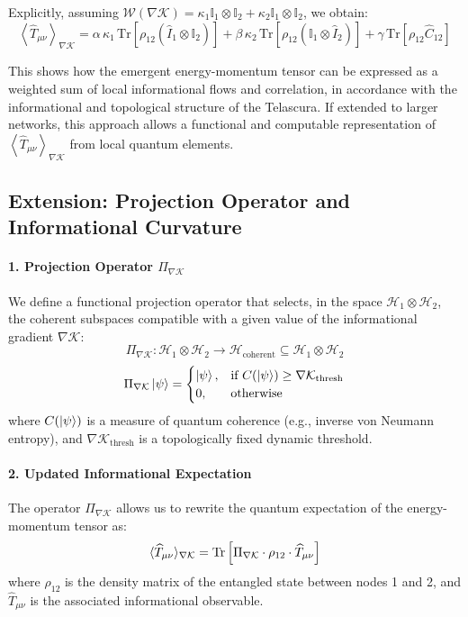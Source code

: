 \documentclass[12pt]{article}
\begin{document}
Explicitly, assuming $\mathcal{W}(\nabla \mathcal{K}) = \kappa_1 \mathbb{I}_1 \otimes \mathbb{I}_2 + \kappa_2 \mathbb{I}_1 \otimes \mathbb{I}_2$, we obtain:
\[
\left\langle \hat{T}_{\mu\nu} \right\rangle_{\nabla \mathcal{K}} = \alpha\, \kappa_1\, \text{Tr} \left[ \rho_{12} (\hat{I}_1 \otimes \mathbb{I}_2) \right] + \beta\, \kappa_2\, \text{Tr} \left[ \rho_{12} (\mathbb{I}_1 \otimes \hat{I}_2) \right] + \gamma\, \text{Tr} \left[ \rho_{12} \hat{C}_{12} \right]
\]

This shows how the emergent energy-momentum tensor can be expressed as a weighted sum of local informational flows and correlation, in accordance with the informational and topological structure of the Telascura. If extended to larger networks, this approach allows a functional and computable representation of $\left\langle \hat{T}_{\mu\nu} \right\rangle_{\nabla \mathcal{K}}$ from local quantum elements.

\subsection*{Extension: Projection Operator and Informational Curvature}

\paragraph{1. Projection Operator $\Pi_{\nabla \mathcal{K}}$}
We define a functional projection operator that selects, in the space $\mathcal{H}_1 \otimes \mathcal{H}_2$, the coherent subspaces compatible with a given value of the informational gradient $\nabla \mathcal{K}$:
\[
\Pi_{\nabla \mathcal{K}} : \mathcal{H}_1 \otimes \mathcal{H}_2 \rightarrow \mathcal{H}_{\text{coherent}} \subseteq \mathcal{H}_1 \otimes \mathcal{H}_2
\]
\[
\Pi_{\nabla \mathcal{K}} \ket{\psi} =
\begin{cases}
\ket{\psi}, & \text{if } C(\ket{\psi}) \geq \nabla \mathcal{K}_\text{thresh} \\
0, & \text{otherwise}
\end{cases}
\]
where $C(\ket{\psi})$ is a measure of quantum coherence (e.g., inverse von Neumann entropy), and $\nabla \mathcal{K}_\text{thresh}$ is a topologically fixed dynamic threshold.

\paragraph{2. Updated Informational Expectation}
The operator $\Pi_{\nabla \mathcal{K}}$ allows us to rewrite the quantum expectation of the energy-momentum tensor as:
\[
\langle \widehat{T}_{\mu\nu} \rangle_{\nabla \mathcal{K}} =
\Tr\left[ \Pi_{\nabla \mathcal{K}} \cdot \rho_{12} \cdot \widehat{T}_{\mu\nu} \right]
\]
where $\rho_{12}$ is the density matrix of the entangled state between nodes 1 and 2, and $\widehat{T}_{\mu\nu}$ is the associated informational observable.
\end{document}
